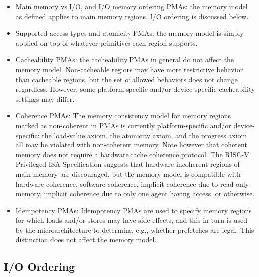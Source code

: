 \begin{itemize}
  \item Main memory vs.\@ I/O, and I/O memory ordering PMAs: the memory model as defined applies to main memory regions.  I/O ordering is discussed below.
  \item Supported access types and atomicity PMAs: the memory model is simply applied on top of whatever primitives each region supports.
  \item Cacheability PMAs: the cacheability PMAs in general do not affect the memory model.  Non-cacheable regions may have more restrictive behavior than cacheable regions, but the set of allowed behaviors does not change regardless.  However, some platform-specific and/or device-specific cacheability settings may differ.
  \item Coherence PMAs: The memory consistency model for memory regions marked as non-coherent in PMAs is currently platform-specific and/or device-specific: the load-value axiom, the atomicity axiom, and the progress axiom all may be violated with non-coherent memory.  Note however that coherent memory does not require a hardware cache coherence protocol.  The RISC-V Privileged ISA Specification suggests that hardware-incoherent regions of main memory are discouraged, but the memory model is compatible with hardware coherence, software coherence, implicit coherence due to read-only memory, implicit coherence due to only one agent having access, or otherwise.
  \item Idempotency PMAs: Idempotency PMAs are used to specify memory regions for which loads and/or stores may have side effects, and this in turn is used by the microarchitecture to determine, e.g., whether prefetches are legal.  This distinction does not affect the memory model.
\end{itemize}


\subsection{I/O Ordering}

